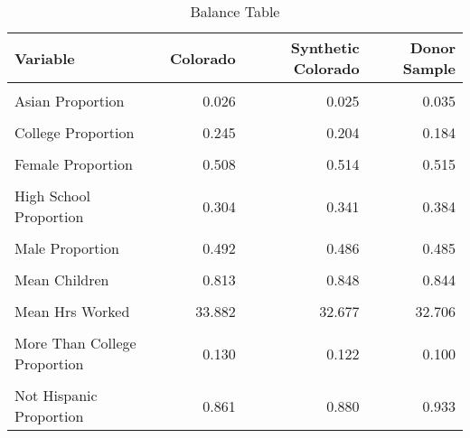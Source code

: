 \begin{table}[H]

\caption{\label{tab:balance_table_colorado}Balance Table}
\centering
\begin{tabular}[t]{lrrr}
\toprule
Variable & Colorado & Synthetic Colorado & Donor Sample\\
\midrule
\cellcolor{gray!6}{American Indian Proportion} & \cellcolor{gray!6}{0.009} & \cellcolor{gray!6}{0.022} & \cellcolor{gray!6}{0.014}\\
Asian Proportion & 0.026 & 0.025 & 0.035\\
\cellcolor{gray!6}{Black Proportion} & \cellcolor{gray!6}{0.030} & \cellcolor{gray!6}{0.059} & \cellcolor{gray!6}{0.098}\\
College Proportion & 0.245 & 0.204 & 0.184\\
\cellcolor{gray!6}{Employed Proportion} & \cellcolor{gray!6}{0.753} & \cellcolor{gray!6}{0.732} & \cellcolor{gray!6}{0.726}\\
\addlinespace
Female Proportion & 0.508 & 0.514 & 0.515\\
\cellcolor{gray!6}{Hispanic Proportion} & \cellcolor{gray!6}{0.139} & \cellcolor{gray!6}{0.120} & \cellcolor{gray!6}{0.067}\\
High School Proportion & 0.304 & 0.341 & 0.384\\
\cellcolor{gray!6}{Less Than High School Proportion} & \cellcolor{gray!6}{0.068} & \cellcolor{gray!6}{0.084} & \cellcolor{gray!6}{0.090}\\
Male Proportion & 0.492 & 0.486 & 0.485\\
\addlinespace
\cellcolor{gray!6}{Married Proportion} & \cellcolor{gray!6}{0.632} & \cellcolor{gray!6}{0.604} & \cellcolor{gray!6}{0.627}\\
Mean Children & 0.813 & 0.848 & 0.844\\
\cellcolor{gray!6}{Mean Children U5} & \cellcolor{gray!6}{0.183} & \cellcolor{gray!6}{0.179} & \cellcolor{gray!6}{0.174}\\
Mean Hrs Worked & 33.882 & 32.677 & 32.706\\
\cellcolor{gray!6}{Median Income} & \cellcolor{gray!6}{24523.077} & \cellcolor{gray!6}{23473.869} & \cellcolor{gray!6}{21327.955}\\
\addlinespace
More Than College Proportion & 0.130 & 0.122 & 0.100\\
\cellcolor{gray!6}{Not Employed Proportion} & \cellcolor{gray!6}{0.247} & \cellcolor{gray!6}{0.268} & \cellcolor{gray!6}{0.274}\\
Not Hispanic Proportion & 0.861 & 0.880 & 0.933\\

\end{tabular}
\end{table}
